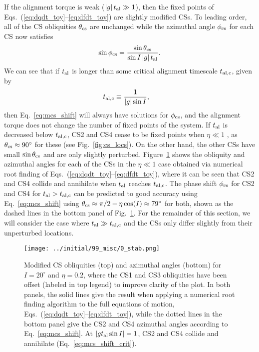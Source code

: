 \documentclass[
        fleqn,
        usenatbib,
        referee,
    ]{mnras}
\newcommand*{\abs}[1]{\left|#1\right|}
\newlength{\colummwidth}
\begin{document}
If the alignment torque is weak ($\abs{g}t_{\rm al} \gg 1$), then the fixed
points of Eqs.~(\ref{eq:dqdt_toy}--\ref{eq:dfdt_toy}) are slightly modified CSs.
To leading order, all of the CS obliquities $\theta_{\rm cs}$ are unchanged
while the azimuthal angle $\phi_{\rm cs}$ for each CS now satisfies
\begin{equation}
    \sin \phi_{\rm cs} = \frac{\sin\theta_{\rm cs}}{\sin I \abs{g}t_{\rm al}}.
        \label{eq:mcs_shift}
\end{equation}
We can see that if $t_{\rm al}$ is longer than some critical alignment
timescale $t_{\rm al, c}$, given by
\begin{align}
    t_{\rm al, c} &\equiv \frac{1}{\abs{g}\sin I},\label{eq:mcs_shift_crit}
\end{align}
then Eq.~\eqref{eq:mcs_shift} will always have solutions for $\phi_{\rm cs}$,
and the alignment torque does not change the number of fixed points of the
system. If $t_{\rm al}$ is decreased below $t_{\rm al, c}$, CS2 and CS4 cease to
be fixed points when $\eta \ll 1$ \citep[as first noted in][]{fabrycky_otides},
as $\theta_{\rm cs} \approx 90^\circ$ for these (see Fig.~\ref{fig:cs_locs}). On
the other hand, the other CSs have small $\sin \theta_{\rm cs}$ and are only
slightly perturbed. Figure~\ref{fig:mcs} shows the obliquity and azimuthal
angles for each of the CSs in the $\eta \ll 1$ case obtained via numerical
root finding of Eqs.~(\ref{eq:dqdt_toy}--\ref{eq:dfdt_toy}), where it can be
seen that CS2 and CS4 collide and annihilate when $t_{\rm al}$ reaches $t_{\rm
al, c}$. The phase shift $\phi_{\rm cs}$ for CS2 and CS4 for $t_{\rm al} >
t_{\rm al, c}$ can be predicted to good accuracy using Eq.~\eqref{eq:mcs_shift}
using $\theta_{\rm cs} \approx \pi/2 - \eta \cos (I) \approx 79^\circ$
\citep{su2020} for both, shown as the dashed lines in the bottom panel of
Fig.~\ref{fig:mcs}. For the remainder of this section, we will consider the case
where $t_{\rm al} \gg t_{\rm al, c}$ and the CSs only differ slightly from their
unperturbed locations.
\begin{figure}
    \centering
    \texttt{[image: ../initial/99\_misc/0\_stab.png]}
    \caption{Modified CS obliquities (top) and azimuthal angles (bottom) for $I
    = 20^\circ$ and $\eta = 0.2$, where the CS1 and CS3 obliquities have been
    offset (labeled in top legend) to improve clarity of the plot. In both
    panels, the solid lines give the result when applying a numerical root
    finding algorithm to the full equations of motion,
    Eqs.~(\ref{eq:dqdt_toy}--\ref{eq:dfdt_toy}), while the dotted lines in the
    bottom panel give the CS2 and CS4 azimuthal angles according to
    Eq.~\eqref{eq:mcs_shift}. At $\abs{gt_{\rm al} \sin I} = 1$, CS2 and CS4
    collide and annihilate (Eq.~\ref{eq:mcs_shift_crit}).}\label{fig:mcs}
\end{figure}
\end{document}
